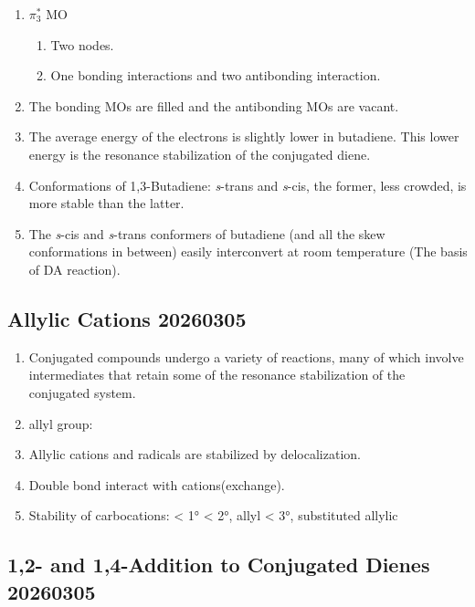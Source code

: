 \begin{enumerate}
    \item $\pi_3^*$ MO
    \begin{enumerate}
        \item Two nodes.
        \item One bonding interactions and two antibonding interaction.
    \end{enumerate}
    \item The bonding MOs are filled and the antibonding MOs are vacant.
    \item The average energy of the electrons is slightly lower in butadiene. This lower energy is the resonance stabilization of the conjugated diene.
    \item Conformations of 1,3-Butadiene: \textit{s}-trans and \textit{s}-cis, the former, less crowded, is more stable than the latter.
    \item The \textit{s}-cis and \textit{s}-trans conformers of butadiene (and all the skew conformations in between) easily interconvert at room temperature (The basis of DA reaction).
\end{enumerate}

\subsection{Allylic Cations 20260305}

\begin{enumerate}
    \item Conjugated compounds undergo a variety of reactions, many of which involve intermediates that retain some of the resonance stabilization of the conjugated system.
    \item allyl group: 
    \item Allylic cations and radicals are stabilized by delocalization.
    \item Double bond interact with cations(exchange). %
    \item Stability of carbocations:  < 1° < 2°, allyl < 3°, substituted allylic
\end{enumerate}

\subsection{1,2- and 1,4-Addition to Conjugated Dienes 20260305}

